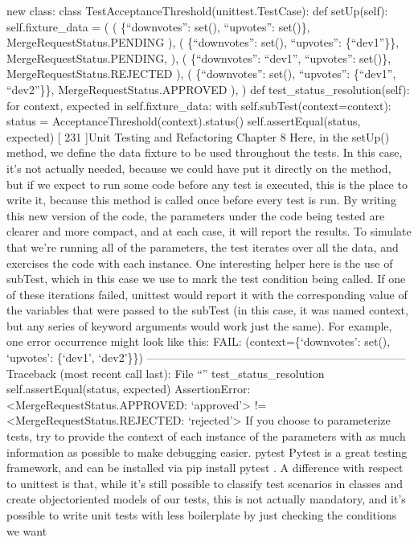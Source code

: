 \documentclass[a4paper,10pt,english]{sphinxmanual}
\begin{document}
new class:
class TestAcceptanceThreshold(unittest.TestCase):
def setUp(self):
self.fixture\_data = (
(
\{“downvotes”: set(), “upvotes”: set()\},
MergeRequestStatus.PENDING
),
(
\{“downvotes”: set(), “upvotes”: \{“dev1”\}\},
MergeRequestStatus.PENDING,
),
(
\{“downvotes”: “dev1”, “upvotes”: set()\},
MergeRequestStatus.REJECTED
),
(
\{“downvotes”: set(), “upvotes”: \{“dev1”, “dev2”\}\},
MergeRequestStatus.APPROVED
),
)
def test\_status\_resolution(self):
for context, expected in self.fixture\_data:
with self.subTest(context=context):
status = AcceptanceThreshold(context).status()
self.assertEqual(status, expected)
{[} 231 {]}Unit Testing and Refactoring
Chapter 8
Here, in the setUp() method, we define the data fixture to be used throughout the tests. In
this case, it’s not actually needed, because we could have put it directly on the method, but
if we expect to run some code before any test is executed, this is the place to write it,
because this method is called once before every test is run.
By writing this new version of the code, the parameters under the code being tested are
clearer and more compact, and at each case, it will report the results.
To simulate that we’re running all of the parameters, the test iterates over all the data, and
exercises the code with each instance. One interesting helper here is the use of subTest,
which in this case we use to mark the test condition being called. If one of these iterations
failed, unittest would report it with the corresponding value of the variables that were
passed to the subTest (in this case, it was named context, but any series of keyword
arguments would work just the same). For example, one error occurrence might look like
this:
FAIL: (context=\{‘downvotes’: set(), ‘upvotes’: \{‘dev1’, ‘dev2’\}\})
———————————————————————\sphinxhyphen{}
Traceback (most recent call last):
File “” test\_status\_resolution
self.assertEqual(status, expected)
AssertionError: \textless{}MergeRequestStatus.APPROVED: ‘approved’\textgreater{} !=
\textless{}MergeRequestStatus.REJECTED: ‘rejected’\textgreater{}
If you choose to parameterize tests, try to provide the context of each
instance of the parameters with as much information as possible to make
debugging easier.
pytest
Pytest is a great testing framework, and can be installed via pip install pytest . A
difference with respect to unittest is that, while it’s still possible to classify test scenarios
in classes and create object\sphinxhyphen{}oriented models of our tests, this is not actually mandatory, and
it’s possible to write unit tests with less boilerplate by just checking the conditions we want
\end{document}
